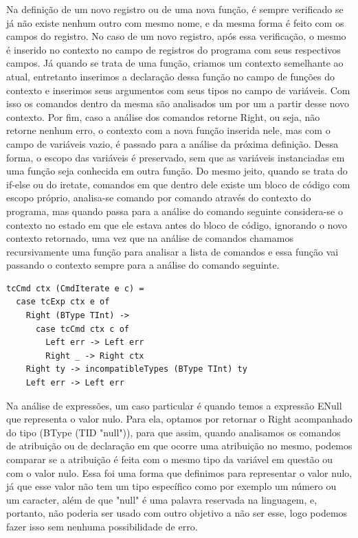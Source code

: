\documentclass{article}
\begin{document}
    Na definição de um novo registro ou de uma nova função, é sempre verificado se já não existe nenhum outro com mesmo nome, e da mesma forma é feito com os campos do registro. No caso de um novo registro, após essa verificação, o mesmo é inserido no contexto no campo de registros do programa com seus respectivos campos. Já quando se trata de uma função, criamos um contexto semelhante ao atual, entretanto inserimos a declaração dessa função no campo de funções do contexto e inserimos seus argumentos com seus tipos no campo de variáveis. Com isso os comandos dentro da mesma são analisados um por um a partir desse novo contexto. Por fim, caso a análise dos comandos retorne Right, ou seja, não retorne nenhum erro, o contexto com a nova função inserida nele, mas com o campo de variáveis vazio, é passado para a análise da próxima definição. Dessa forma, o escopo das variáveis é preservado, sem que as variáveis instanciadas em uma função seja conhecida em outra função. Do mesmo jeito, quando se trata do if-else ou do iretate, comandos em que dentro dele existe um bloco de código com escopo próprio, analisa-se comando por comando através do contexto do programa, mas quando passa para a análise do comando seguinte considera-se o contexto no estado em que ele estava antes do bloco de código, ignorando o novo contexto retornado, uma vez que na análise de comandos chamamos recursivamente uma função para analisar a lista de comandos e essa função vai passando o contexto sempre para a análise do comando seguinte.

    \begin{lstlisting}
tcCmd ctx (CmdIterate e c) =
  case tcExp ctx e of
    Right (BType TInt) ->
      case tcCmd ctx c of
        Left err -> Left err
        Right _ -> Right ctx
    Right ty -> incompatibleTypes (BType TInt) ty
    Left err -> Left err
    \end{lstlisting}

    Na análise de expressões, um caso particular é quando temos a expressão ENull que representa o valor nulo. Para ela, optamos por retornar o Right acompanhado do tipo (BType (TID "null")), para que assim, quando analisamos os comandos de atribuição ou de declaração em que ocorre uma atribuição no mesmo, podemos comparar se a atribuição é feita com o mesmo tipo da variável em questão ou com o valor nulo. Essa foi uma forma que definimos para representar o valor nulo, já que esse valor não tem um tipo específico como por exemplo um número ou um caracter, além de que "null" é uma palavra reservada na linguagem, e, portanto, não poderia ser usado com outro objetivo a não ser esse, logo podemos fazer isso sem nenhuma possibilidade de erro.
\end{document}
